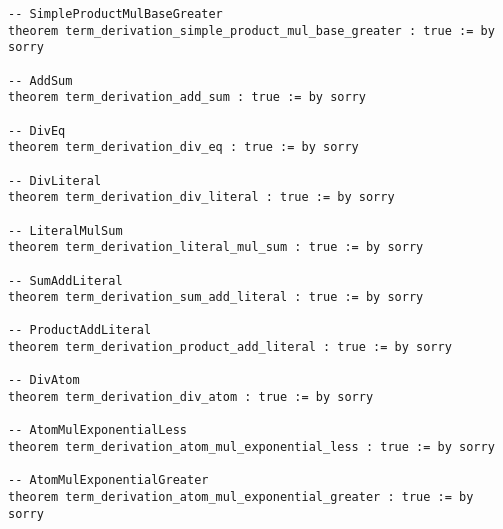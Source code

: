 \documentclass{article}
\begin{document}
\begin{tcolorbox}[colback=white!10, width=\linewidth]
\begin{lstlisting}[language=Lean4]
-- SimpleProductMulBaseGreater
theorem term_derivation_simple_product_mul_base_greater : true := by sorry

-- AddSum
theorem term_derivation_add_sum : true := by sorry

-- DivEq
theorem term_derivation_div_eq : true := by sorry

-- DivLiteral
theorem term_derivation_div_literal : true := by sorry

-- LiteralMulSum
theorem term_derivation_literal_mul_sum : true := by sorry

-- SumAddLiteral
theorem term_derivation_sum_add_literal : true := by sorry

-- ProductAddLiteral
theorem term_derivation_product_add_literal : true := by sorry

-- DivAtom
theorem term_derivation_div_atom : true := by sorry

-- AtomMulExponentialLess
theorem term_derivation_atom_mul_exponential_less : true := by sorry

-- AtomMulExponentialGreater
theorem term_derivation_atom_mul_exponential_greater : true := by sorry



\end{lstlisting}
\end{tcolorbox}
\end{document}
